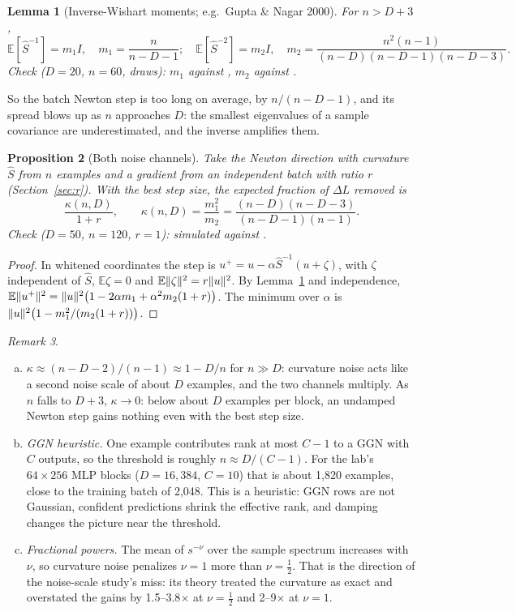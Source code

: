 \documentclass[11pt,a4paper]{article}
\DeclarePairedDelimiter{\norm}{\lVert}{\rVert}
\newcommand{\E}{\mathbb{E}}
\theoremstyle{plain}
\newtheorem{proposition}{Proposition}
\newtheorem{lemma}[proposition]{Lemma}
\theoremstyle{definition}
\theoremstyle{remark}
\newtheorem{remark}[proposition]{Remark}
\begin{document}
\begin{lemma}[Inverse-Wishart moments; e.g.\ Gupta \& Nagar 2000]\label{lem:wishart}
For $n>D+3$,
\[
\E[\hat S^{-1}]=m_1I,\quad m_1=\frac{n}{n-D-1};\quad
\E[\hat S^{-2}]=m_2I,\quad m_2=\frac{n^2(n-1)}{(n-D)(n-D-1)(n-D-3)} .
\]
\vspace{-0.5\baselineskip}
Check ($D=20$, $n=60$, \NumWishDraws{} draws): $m_1$ \NumWishMOne{} against \NumWishMOnePred, $m_2$ \NumWishMTwo{}
against \NumWishMTwoPred.
\end{lemma}

So the batch Newton step is too long on average, by $n/(n-D-1)$, and its spread blows up as $n$ approaches $D$:
the smallest eigenvalues of a sample covariance are underestimated, and the inverse amplifies them.

\begin{proposition}[Both noise channels]\label{prop:both}
Take the Newton direction with curvature $\hat S$ from $n$ examples and a gradient from an independent batch with
ratio $r$ (Section~\ref{sec:r}). With the best step size, the expected fraction of $\Delta L$ removed is
\[
\frac{\kappa(n,D)}{1+r},\qquad \kappa(n,D)=\frac{m_1^2}{m_2}=\frac{(n-D)(n-D-3)}{(n-D-1)(n-1)} .
\]
Check ($D=50$, $n=120$, $r=1$): \NumProdSim{} simulated against \NumProdPred.
\end{proposition}
\begin{proof}
In whitened coordinates the step is $u^+=u-\alpha\hat S^{-1}(u+\zeta)$, with $\zeta$ independent of $\hat S$,
$\E\zeta=0$ and $\E\norm{\zeta}^2=r\norm{u}^2$. By Lemma~\ref{lem:wishart} and independence,
$\E\norm{u^+}^2=\norm{u}^2\bigl(1-2\alpha m_1+\alpha^2m_2(1+r)\bigr)$. The minimum over $\alpha$ is
$\norm{u}^2\bigl(1-m_1^2/(m_2(1+r))\bigr)$.
\end{proof}

\begin{remark}\leavevmode
\begin{enumerate}[(a),nosep]
\item $\kappa\approx(n-D-2)/(n-1)\approx1-D/n$ for $n\gg D$: curvature noise acts like a second noise scale of
  about $D$ examples, and the two channels multiply. As $n$ falls to $D+3$, $\kappa\to0$: below about $D$ examples
  per block, an undamped Newton step gains nothing even with the best step size.
\item \emph{GGN heuristic.} One example contributes rank at most $C-1$ to a GGN with $C$ outputs, so the threshold
  is roughly $n\approx D/(C-1)$. For the lab's $64\times256$ MLP blocks ($D=16{,}384$, $C=10$) that is about
  1{,}820 examples, close to the training batch of 2{,}048. This is a heuristic: GGN rows are not Gaussian, confident
  predictions shrink the effective rank, and damping changes the picture near the threshold.
\item \emph{Fractional powers.} The mean of $s^{-\nu}$ over the sample spectrum increases with $\nu$, so curvature
  noise penalizes $\nu=1$ more than $\nu=\frac12$. That is the direction of the noise-scale study's miss: its theory
  treated the curvature as exact and overstated the gains by 1.5--3.8$\times$ at $\nu=\frac12$ and 2--9$\times$ at
  $\nu=1$.
\end{enumerate}
\end{remark}
\end{document}
